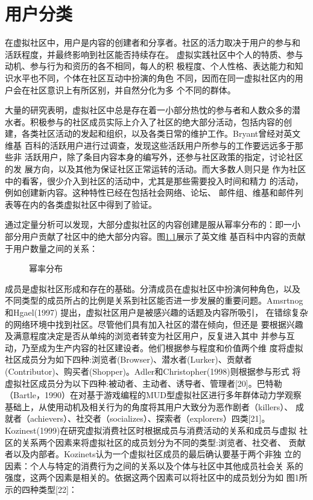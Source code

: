 
\chapter{用户分类}
\label{cha:user-category}

在虚拟社区中，用户是内容的创建者和分享者。社区的活力取决于用户的参与和
活跃程度，并最终影响到社区能否持续存在。
虚拟实践社区中个人的特质、参与动机、参与行为和资历的各不相同，每人的积
极程度、个人性格、表达能力和知识水平也不同，个体在社区互动中扮演的角色
不同，因而在同一虚拟社区内的用户会在社区意识上有所区别，并自然分化为多
个不同的群体。

大量的研究表明，虚拟社区中总是存在着一小部分热忱的参与者和人数众多的潜
水者。积极参与的社区成员实际上介入了社区的绝大部分活动，包括内容的创
建，各类社区活动的发起和组织，以及各类日常的维护工作。Bryant曾经对英文维基
百科的活跃用户进行过调查，发现这些活跃用户所参与的工作要远远多于那些非
活跃用户，除了条目内容本身的编写外，还参与社区政策的指定，讨论社区的发
展方向，以及其他为保证社区正常运转的活动\cite{1099205}。而大多数人则只是
作为社区中的看客，很少介入到社区的活动中，尤其是那些需要投入时间和精力
的活动，例如创建新内容。这种特性已经在包括社会网络、论坛、
邮件组、维基和邮件列表等在内的各类虚拟社区中得到了验证。

通过定量分析可以发现，大部分虚拟社区的内容创建是服从幂率分布的：即一小
部分用户贡献了社区中的绝大部分内容。图\ref{fig:power-law}展示了英文维
基百科中内容的贡献于用户数量之间的关系：

\begin{figure}
  \centering
 \scalebox{0.4}{ \texttt{[image: 02-3]}}
  \caption{幂率分布}
  \label{fig:power-law}
\end{figure}

成员是虚拟社区形成和存在的基础。分清成员在虚拟社区中扮演何种角色，以及
不同类型的成员所占的比例是关系到社区能否进一步发展的重要问题。Amsrtnog和Hgael(1997) 提出，虚拟社区用户是被感兴趣的话题及内容所吸引，
在错综复杂的网络环境中找到社区。尽管他们具有加入社区的潜在倾向，但还是
要根据兴趣及满意程度决定是否从单纯的浏览者转变为社区用户，反复进入其中
并参与互动，乃至成为生产内容的社区建设者。他们根据参与程度和价值两个维
度将虚拟社区成员分为如下四种:浏览者(Browser)、潜水者(Lurker)、贡献者
(Contributor)、购买者(Shopper)。Adler和Christopher(1998)则根据参与形式
将虚拟社区成员分为以下四种:被动者、主动者、诱导者、管理者[20]。巴特勒
（Bartle，1990）在对基于游戏编程的MUD型虚拟社区进行多年群体动力学观察
基础上，从使用动机及相关行为的角度将其用户大致分为恶作剧者（killers）、
成就者（achievers）、社交者（socializes）、探索者（explorers）四类[21]。
Kozinest(1999)在研究虚拟消费社区时根据成员与消费活动的关系和成员与虚拟
社区的关系两个因素来将虚拟社区的成员划分为不同的类型:浏览者、社交者、
贡献者以及内部者。Kozinets认为一个虚拟社区成员的最后确认要基于两个非独
立的因素：个人与特定的消费行为之间的关系以及个体与社区中其他成员社会关
系的强度，这两个因素是相关的。依据这两个因素可以将社区中的成员划分为如
图1所示的四种类型[22]：

